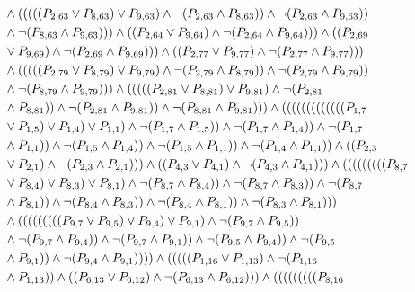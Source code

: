 \documentclass[10pt]{article}
\begin{document}
\begin{align*}
& \land (((((\PV{2,63} \lor \PV{8,63}) \lor \PV{9,63}) \land \lnot(\PV{2,63} \land \PV{8,63})) \land \lnot(\PV{2,63} \land \PV{9,63})) \\
& \land \lnot(\PV{8,63} \land \PV{9,63}))) \land ((\PV{2,64} \lor \PV{9,64}) \land \lnot(\PV{2,64} \land \PV{9,64}))) \land ((\PV{2,69} \\
& \lor \PV{9,69}) \land \lnot(\PV{2,69} \land \PV{9,69}))) \land ((\PV{2,77} \lor \PV{9,77}) \land \lnot(\PV{2,77} \land \PV{9,77}))) \\
& \land (((((\PV{2,79} \lor \PV{8,79}) \lor \PV{9,79}) \land \lnot(\PV{2,79} \land \PV{8,79})) \land \lnot(\PV{2,79} \land \PV{9,79})) \\
& \land \lnot(\PV{8,79} \land \PV{9,79}))) \land (((((\PV{2,81} \lor \PV{8,81}) \lor \PV{9,81}) \land \lnot(\PV{2,81} \\
& \land \PV{8,81})) \land \lnot(\PV{2,81} \land \PV{9,81})) \land \lnot(\PV{8,81} \land \PV{9,81}))) \land (((((((((((((\PV{1,7} \\
& \lor \PV{1,5}) \lor \PV{1,4}) \lor \PV{1,1}) \land \lnot(\PV{1,7} \land \PV{1,5})) \land \lnot(\PV{1,7} \land \PV{1,4})) \land \lnot(\PV{1,7} \\
& \land \PV{1,1})) \land \lnot(\PV{1,5} \land \PV{1,4})) \land \lnot(\PV{1,5} \land \PV{1,1})) \land \lnot(\PV{1,4} \land \PV{1,1})) \land ((\PV{2,3} \\
& \lor \PV{2,1}) \land \lnot(\PV{2,3} \land \PV{2,1}))) \land ((\PV{4,3} \lor \PV{4,1}) \land \lnot(\PV{4,3} \land \PV{4,1}))) \land (((((((((\PV{8,7} \\
& \lor \PV{8,4}) \lor \PV{8,3}) \lor \PV{8,1}) \land \lnot(\PV{8,7} \land \PV{8,4})) \land \lnot(\PV{8,7} \land \PV{8,3})) \land \lnot(\PV{8,7} \\
& \land \PV{8,1})) \land \lnot(\PV{8,4} \land \PV{8,3})) \land \lnot(\PV{8,4} \land \PV{8,1})) \land \lnot(\PV{8,3} \land \PV{8,1}))) \\
& \land (((((((((\PV{9,7} \lor \PV{9,5}) \lor \PV{9,4}) \lor \PV{9,1}) \land \lnot(\PV{9,7} \land \PV{9,5})) \\
& \land \lnot(\PV{9,7} \land \PV{9,4})) \land \lnot(\PV{9,7} \land \PV{9,1})) \land \lnot(\PV{9,5} \land \PV{9,4})) \land \lnot(\PV{9,5} \\
& \land \PV{9,1})) \land \lnot(\PV{9,4} \land \PV{9,1})))) \land (((((\PV{1,16} \lor \PV{1,13}) \land \lnot(\PV{1,16} \\
& \land \PV{1,13})) \land ((\PV{6,13} \lor \PV{6,12}) \land \lnot(\PV{6,13} \land \PV{6,12}))) \land (((((((((\PV{8,16} \\

\end{align*}
\end{document}
